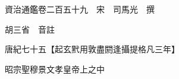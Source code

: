 










 


 
 


 

  
  
  
  
  





  
  
  
  
  
 
  

  

  
  
  



  

 
 

  
   




  

  
  


  　　資治通鑑卷二百五十九　宋　司馬光　撰

　　胡三省　音註

　　唐紀七十五【起玄黓用敦盡閼逢攝提格凡三年】

　　昭宗聖穆景文孝皇帝上之中

